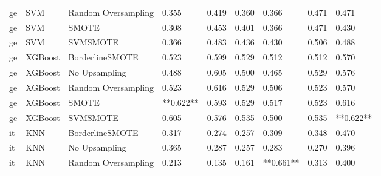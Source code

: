 \begin{tabular}{lllllllll}
      ge &                          SVM & Random Oversampling &     0.355 &                     0.419 &                 0.360 &                  0.366 &                                   0.471 &     0.471 \\
      ge &                          SVM &               SMOTE &     0.308 &                     0.453 &                 0.401 &                  0.366 &                                   0.471 &     0.430 \\
      ge &                          SVM &            SVMSMOTE &     0.366 &                     0.483 &                 0.436 &                  0.430 &                                   0.506 &     0.488 \\
      ge &                      XGBoost &     BorderlineSMOTE &     0.523 &                     0.599 &                 0.529 &                  0.512 &                                   0.512 &     0.570 \\
      ge &                      XGBoost &       No Upsampling &     0.488 &                     0.605 &                 0.500 &                  0.465 &                                   0.529 &     0.576 \\
      ge &                      XGBoost & Random Oversampling &     0.523 &                     0.616 &                 0.529 &                  0.506 &                                   0.523 &     0.570 \\
      ge &                      XGBoost &               SMOTE & **0.622** &                     0.593 &                 0.529 &                  0.517 &                                   0.523 &     0.616 \\
      ge &                      XGBoost &            SVMSMOTE &     0.605 &                     0.576 &                 0.535 &                  0.500 &                                   0.535 & **0.622** \\
      it &                          KNN &     BorderlineSMOTE &     0.317 &                     0.274 &                 0.257 &                  0.309 &                                   0.348 &     0.470 \\
      it &                          KNN &       No Upsampling &     0.365 &                     0.287 &                 0.257 &                  0.283 &                                   0.270 &     0.396 \\
      it &                          KNN & Random Oversampling &     0.213 &                     0.135 &                 0.161 &              **0.661** &                                   0.313 &     0.400 \\

\end{tabular}

